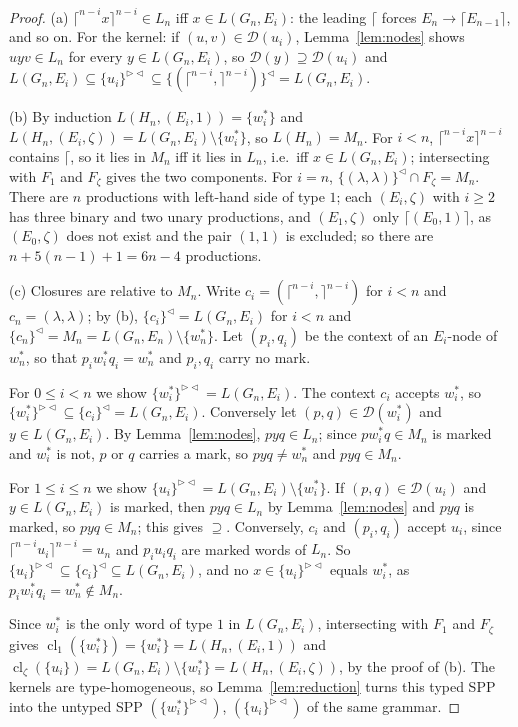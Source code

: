 \documentclass[11pt]{article}
\numberwithin{equation}{section}
\theoremstyle{plain}
\theoremstyle{definition}
\theoremstyle{remark}
\theoremstyle{plain}
\newcommand{\eps}{\lambda}
\newcommand{\Lc}{^{\lhd}}
\newcommand{\RL}{^{\rhd\lhd}}
\newcommand{\cl}{\operatorname{cl}}
\newcommand{\D}{\mathcal D}
\newcommand{\Lce}{\lceil}
\newcommand{\Rce}{\rceil}
\begin{document}
\begin{proof}
(a) $\Lce^{n-i}x\Rce^{n-i}\in L_n$ iff $x\in L(G_n,E_i)$: the leading $\Lce$
forces $E_n\to\Lce E_{n-1}\Rce$, and so on.  For the kernel: if
$(u,v)\in\D(u_i)$, Lemma~\ref{lem:nodes} shows $uyv\in L_n$ for every
$y\in L(G_n,E_i)$, so $\D(y)\supseteq\D(u_i)$ and
$L(G_n,E_i)\subseteq\{u_i\}\RL\subseteq\{(\Lce^{n-i},\Rce^{n-i})\}\Lc=L(G_n,E_i)$.

(b) By induction $L(H_n,(E_i,1))=\{w^*_i\}$ and
$L(H_n,(E_i,\zeta))=L(G_n,E_i)\setminus\{w^*_i\}$, so $L(H_n)=M_n$.  For $i<n$,
$\Lce^{n-i}x\Rce^{n-i}$ contains $\Lce$, so it lies in $M_n$ iff it lies in
$L_n$, i.e.\ iff $x\in L(G_n,E_i)$; intersecting with $F_1$ and $F_\zeta$ gives
the two components.  For $i=n$, $\{(\eps,\eps)\}\Lc\cap F_\zeta=M_n$.  There
are $n$ productions with left-hand side of type $1$; each $(E_i,\zeta)$ with
$i\ge2$ has three binary and two unary productions, and $(E_1,\zeta)$ only
$\Lce(E_0,1)\Rce$, as $(E_0,\zeta)$ does not exist and the pair $(1,1)$ is
excluded; so there are $n+5(n-1)+1=6n-4$ productions.

(c) Closures are relative to $M_n$.  Write $c_i=(\Lce^{n-i},\Rce^{n-i})$
for $i<n$ and $c_n=(\eps,\eps)$; by (b), $\{c_i\}\Lc=L(G_n,E_i)$ for $i<n$ and
$\{c_n\}\Lc=M_n=L(G_n,E_n)\setminus\{w^*_n\}$.  Let $(p_i,q_i)$ be the context
of an $E_i$-node of $w^*_n$, so that $p_iw^*_iq_i=w^*_n$ and $p_i,q_i$ carry no
mark.

For $0\le i<n$ we show $\{w^*_i\}\RL=L(G_n,E_i)$.  The context $c_i$ accepts
$w^*_i$, so $\{w^*_i\}\RL\subseteq\{c_i\}\Lc=L(G_n,E_i)$.  Conversely let
$(p,q)\in\D(w^*_i)$ and $y\in L(G_n,E_i)$.  By Lemma~\ref{lem:nodes},
$pyq\in L_n$; since $pw^*_iq\in M_n$ is marked and $w^*_i$ is not, $p$ or $q$
carries a mark, so $pyq\ne w^*_n$ and $pyq\in M_n$.

For $1\le i\le n$ we show $\{u_i\}\RL=L(G_n,E_i)\setminus\{w^*_i\}$.  If
$(p,q)\in\D(u_i)$ and $y\in L(G_n,E_i)$ is marked, then $pyq\in L_n$ by
Lemma~\ref{lem:nodes} and $pyq$ is marked, so $pyq\in M_n$; this gives
$\supseteq$.  Conversely, $c_i$ and $(p_i,q_i)$ accept $u_i$, since
$\Lce^{n-i}u_i\Rce^{n-i}=u_n$ and $p_iu_iq_i$ are marked words of $L_n$.  So
$\{u_i\}\RL\subseteq\{c_i\}\Lc\subseteq L(G_n,E_i)$, and no
$x\in\{u_i\}\RL$ equals $w^*_i$, as $p_iw^*_iq_i=w^*_n\notin M_n$.

Since $w^*_i$ is the only word of type $1$ in $L(G_n,E_i)$, intersecting with
$F_1$ and $F_\zeta$ gives $\cl_1(\{w^*_i\})=\{w^*_i\}=L(H_n,(E_i,1))$ and
$\cl_\zeta(\{u_i\})=L(G_n,E_i)\setminus\{w^*_i\}=L(H_n,(E_i,\zeta))$, by the
proof of (b).  The kernels are type-homogeneous, so
Lemma~\ref{lem:reduction} turns this typed SPP into the untyped SPP
$(\{w^*_i\}\RL)$, $(\{u_i\}\RL)$ of the same grammar.
\end{proof}
\end{document}
